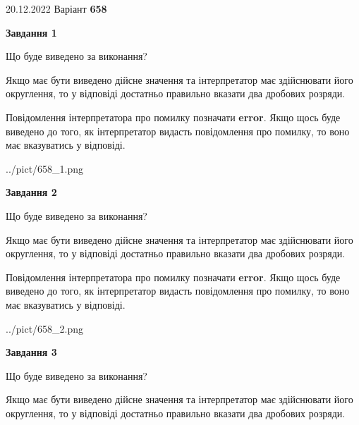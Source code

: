 \documentclass[12pt, ukrainian]{article}
\begin{document}
{20.12.2022 Варіант \No \textbf { 658 }\par}
{
\begin {Large}

{\begin {center}\textbf{Завдання 1}\end {center}}\par
Що буде виведено за виконання? \par

Якщо має бути виведено дійсне значення та інтерпретатор має здійснювати його округлення, 
то у відповіді достатньо правильно вказати два дробових розряди.

Повідомлення інтерпретатора про помилку позначати \textbf{error}.
Якщо щось буде виведено до того, як інтерпретатор видасть повідомлення про помилку, 
то воно має вказуватись у відповіді. \par

\begin{center}
	{../pict/658_1.png}
\end{center}
\newpage

{\begin {center}\textbf{Завдання 2}\end {center}}\par
Що буде виведено за виконання? \par

Якщо має бути виведено дійсне значення та інтерпретатор має здійснювати його округлення, 
то у відповіді достатньо правильно вказати два дробових розряди.

Повідомлення інтерпретатора про помилку позначати \textbf{error}.
Якщо щось буде виведено до того, як інтерпретатор видасть повідомлення про помилку, 
то воно має вказуватись у відповіді. \par

\begin{center}
	{../pict/658_2.png}
\end{center}
\newpage

{\begin {center}\textbf{Завдання 3}\end {center}}\par
Що буде виведено за виконання? \par

Якщо має бути виведено дійсне значення та інтерпретатор має здійснювати його округлення, 
то у відповіді достатньо правильно вказати два дробових розряди.


\end{Large}}
\end{document}
